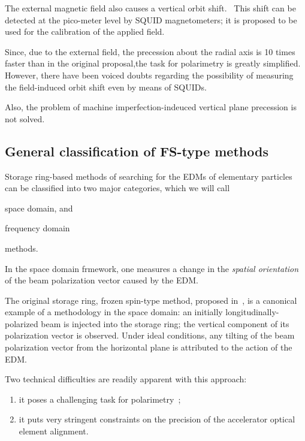 The external magnetic field also causes a vertical orbit shift.~\cite[p.~1963]{Koop:SpinWheel}
This shift can be detected at the pico-meter level by SQUID magnetometers; it is proposed to be used
for the calibration of the applied field.

Since, due to the external field, the precession about the radial axis is 10
times faster than in the original proposal,the task for polarimetry is greatly
simplified. However, there have been voiced doubts regarding the possibility of
measuring the field-induced orbit shift even by means of SQUIDs.

Also, the problem of machine imperfection-indeuced vertical plane precession is not solved.

\subsection{General classification of FS-type methods}
Storage ring-based methods of searching for the EDMs of elementary particles
can be classified into two major categories, which we will call
\begin{enumerate*}
\item space domain, and %
\item frequency domain %
\end{enumerate*}
methods.

In the space domain frmework, one measures a change in the \emph{spatial orientation} of the beam polarization
vector caused by the EDM.

The original storage ring, frozen spin-type method, proposed in~\cite{BNL:Deuteron2008}, is a canonical example of
a methodology in the space domain: an initially longitudinally-polarized beam is injected into the storage ring;
the vertical component of its polarization vector is observed. Under ideal conditions, any tilting of
the beam polarization vector from the horizontal plane is attributed to the action of the EDM.

Two technical difficulties are readily apparent with this approach:
\begin{enumerate}[(1)]
\item it poses a challenging task for polarimetry~\cite{Mane:SpinWheel};
\item it puts very stringent constraints on the precision of the accelerator optical element alignment.
\end{enumerate}

